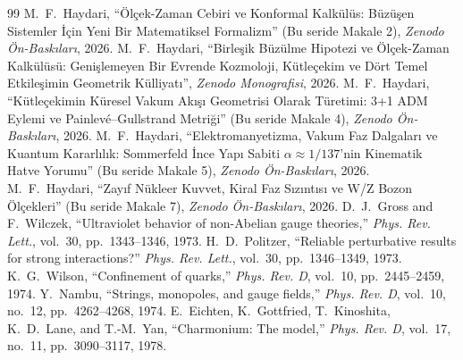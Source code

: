 \documentclass[11pt,a4paper]{article}
\begin{document}
\begin{thebibliography}{99}
     M.~F.~Haydari, ``Ölçek-Zaman Cebiri ve Konformal Kalkülüs: Büzüşen Sistemler İçin Yeni Bir Matematiksel Formalizm'' (Bu seride Makale 2), \textit{Zenodo Ön-Baskıları}, 2026.
     M.~F.~Haydari, ``Birleşik Büzülme Hipotezi ve Ölçek-Zaman Kalkülüsü: Genişlemeyen Bir Evrende Kozmoloji, Kütleçekim ve Dört Temel Etkileşimin Geometrik Külliyatı'', \textit{Zenodo Monografisi}, 2026.
     M.~F.~Haydari, ``Kütleçekimin Küresel Vakum Akışı Geometrisi Olarak Türetimi: 3+1 ADM Eylemi ve Painlevé--Gullstrand Metriği'' (Bu seride Makale 4), \textit{Zenodo Ön-Baskıları}, 2026.
     M.~F.~Haydari, ``Elektromanyetizma, Vakum Faz Dalgaları ve Kuantum Kararlılık: Sommerfeld İnce Yapı Sabiti $\alpha \approx 1/137$'nin Kinematik Hatve Yorumu'' (Bu seride Makale 5), \textit{Zenodo Ön-Baskıları}, 2026.
     M.~F.~Haydari, ``Zayıf Nükleer Kuvvet, Kiral Faz Sızıntısı ve W/Z Bozon Ölçekleri'' (Bu seride Makale 7), \textit{Zenodo Ön-Baskıları}, 2026.
     D.~J.~Gross and F.~Wilczek, ``Ultraviolet behavior of non-Abelian gauge theories,'' \textit{Phys. Rev. Lett.}, vol.~30, pp.~1343--1346, 1973.
     H.~D.~Politzer, ``Reliable perturbative results for strong interactions?'' \textit{Phys. Rev. Lett.}, vol.~30, pp.~1346--1349, 1973.
     K.~G.~Wilson, ``Confinement of quarks,'' \textit{Phys. Rev. D}, vol.~10, pp.~2445--2459, 1974.
     Y.~Nambu, ``Strings, monopoles, and gauge fields,'' \textit{Phys. Rev. D}, vol.~10, no.~12, pp.~4262--4268, 1974.
     E.~Eichten, K.~Gottfried, T.~Kinoshita, K.~D.~Lane, and T.-M.~Yan, ``Charmonium: The model,'' \textit{Phys. Rev. D}, vol.~17, no.~11, pp.~3090--3117, 1978.
\end{thebibliography}
\end{document}
